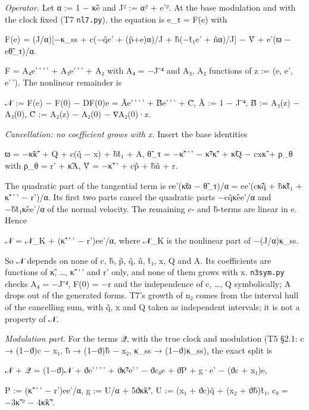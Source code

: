 \documentclass[
]{article}
\begin{document}
\emph{Operator.} Let α := 1 − κ̃e and J² := α² + e'². At the base
modulation and with the clock fixed (T7 \texttt{nl7.py}), the equation
is e\_τ = F(e) with

F(e) = (J/α){[}−κ\_ss + c(−q̃e' + (p̃+e)α)/J + b̃(−t̃₁e' + ñα)/J{]} − Ṽ +
e'(ϖ − eθ̃\_τ)/α.

F = A₄e'\,'\,'\,' + A₃e'\,'\,' + A₂ with A₄ = −J⁻⁴ and A₃, A₂ functions
of z := (e, e', e'\,'). The nonlinear remainder is

𝒩 := F(e) − F(0) − DF(0)e = Ãe'\,'\,'\,' + B̃e'\,'\,' + C̃, Ã := 1 − J⁻⁴,
B̃ := A₃(z) − A₃(0), C̃ := A₂(z) − A₂(0) − ∇A₂(0)·z.

\emph{Cancellation: no coefficient grows with x.} Insert the base
identities

ϖ = −κ̃κ̃' + Q + c(q̃ − x) + b̃t̃₁ + A, θ̃\_τ = −κ̃'\,'\,' − κ̃²κ̃' + κ̃Q − cxκ̃ +
ρ\_θ with ρ\_θ = r' + κ̃A, Ṽ = −κ̃'\,' + cp̃ + b̃ñ + r.

The quadratic part of the tangential term is ee'(κ̃ϖ − θ̃\_τ)/α = ee'(cκ̃q̃
+ b̃κ̃t̃₁ + κ̃'\,'\,' − r')/α. Its first two parts cancel the quadratic
parts −cq̃κ̃ee'/α and −b̃t̃₁κ̃ee'/α of the normal velocity. The remaining c-
and b̃-terms are linear in e. Hence

𝒩 = 𝒩\_K + (κ̃'\,'\,' − r')ee'/α, where 𝒩\_K is the nonlinear part of
−(J/α)κ\_ss.

So 𝒩 depends on none of c, b̃, p̃, q̃, ñ, t̃₁, x, Q and A. Its coefficients
are functions of κ̃, \ldots, κ̃'\,'\,' and r' only, and none of them grows
with x. \texttt{n3sym.py} checks A₄ = −J⁻⁴, F(0) = −r and the
independence of c, \ldots, Q symbolically; A drops out of the generated
forms. T7's growth of n₂ comes from the interval hull of the cancelling
sum, with q̃, x and Q taken as independent intervals; it is not a
property of 𝒩.

\emph{Modulation part.} For the terms 𝒬, with the true clock and
modulation (T5 §2.1: c → (1−ϑ)c − x₁, b̃ → (1−ϑ)b̃ − x₂, κ\_ss →
(1−ϑ)κ\_ss), the exact split is

𝒩 + 𝒬 = (1−ϑ)𝒩 + ϑe'\,'\,'\,' + ϑκ̃²e'\,' − ϑc₀e + ϑP + g·e' − (ϑc +
x₁)e,

P := (κ̃'\,'\,' − r')ee'/α, g := U/α + 5ϑκ̃κ̃`, U := (x₁ + ϑc)q̃ + (x₂ +
ϑb̃)t̃₁, c₀ = −3κ̃'² − 4κ̃κ̃''.
\end{document}
